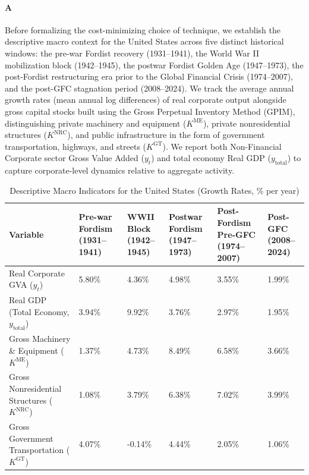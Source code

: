 
\paragraph{A}
Before formalizing the cost-minimizing choice of technique, we establish the descriptive macro context for the United States across five distinct historical windows: the pre-war Fordist recovery (1931–1941), the World War II mobilization block (1942–1945), the postwar Fordist Golden Age (1947–1973), the post-Fordist restructuring era prior to the Global Financial Crisis (1974–2007), and the post-GFC stagnation period (2008–2024). We track the average annual growth rates (mean annual log differences) of real corporate output alongside gross capital stocks built using the Gross Perpetual Inventory Method (GPIM), distinguishing private machinery and equipment (\(K^{\text{ME}}\)), private nonresidential structures (\(K^{\text{NRC}}\)), and public infrastructure in the form of government transportation, highways, and streets (\(K^{\text{GT}}\)). We report both Non-Financial Corporate sector Gross Value Added (\(y_t\)) and total economy Real GDP (\(y_{\text{total}}\)) to capture corporate-level dynamics relative to aggregate activity.

\begin{table}[H]
	\centering
	\caption{Descriptive Macro Indicators for the United States (Growth Rates, \% per year)}
	\label{tab:descriptive_macro_indicators_for_the_united_stat}
	\begin{tabular}{p{5.5cm}p{2.2cm}p{2.2cm}p{2.2cm}p{2.2cm}p{2.2cm}}
		\toprule
		Variable & Pre-war Fordism (1931–1941) & WWII Block (1942–1945) & Postwar Fordism (1947–1973) & Post-Fordism Pre-GFC (1974–2007) & Post-GFC (2008–2024) \\
		\midrule
		Real Corporate GVA (\(y_t\)) & 5.80\% & 4.36\% & 4.98\% & 3.55\% & 1.99\% \\
		Real GDP (Total Economy, \(y_{\text{total}}\)) & 3.94\% & 9.92\% & 3.76\% & 2.97\% & 1.95\% \\
		Gross Machinery \& Equipment (\(K^{\text{ME}}\)) & 1.37\% & 4.73\% & 8.49\% & 6.58\% & 3.66\% \\
		Gross Nonresidential Structures (\(K^{\text{NRC}}\)) & 1.08\% & 3.79\% & 6.38\% & 7.02\% & 3.99\% \\
		Gross Government Transportation (\(K^{\text{GT}}\)) & 4.07\% & -0.14\% & 4.44\% & 2.05\% & 1.06\% \\
		\bottomrule
	\end{tabular}
\end{table}

